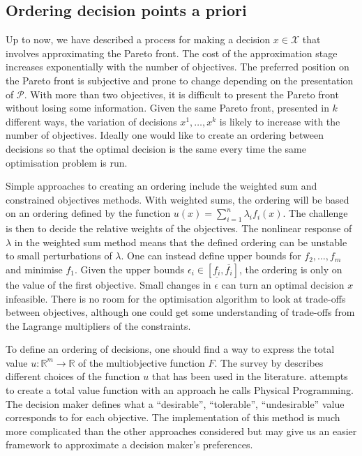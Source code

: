 \documentclass[main.tex]{subfiles}
\begin{document}
\subsection{Ordering decision points a priori}\label{sec:multi_apriori}
Up to now, we have described a process for making a decision
$x\in\mathcal{X}$ that involves approximating the Pareto
front.
The cost of the approximation stage increases exponentially with the
number of objectives. The preferred position on the Pareto front is
subjective and prone to change depending on the presentation of
$\mathcal{P}$. With more than two objectives, it is difficult to
present the Pareto front without losing some information.
Given the same Pareto front, presented in
$k$ different ways, the variation of decisions $x^1,\dots,x^k$ is likely to
increase with the number of objectives.
Ideally one would like to create an ordering between decisions so
that the optimal decision is the same every time the same optimisation
problem is run.

Simple approaches to creating an ordering include the weighted sum
and constrained objectives methods.
With weighted sums, the ordering will be based on
an ordering defined by the function $u(x)=\sum_{i=1}^n\lambda_if_i(x)$.
The challenge is then to decide the relative weights of the objectives. The
nonlinear response of $\lambda$ in the weighted sum method means that
the defined ordering can be unstable to small perturbations of $\lambda$.
One can instead define upper bounds for $f_2,\dots,f_m$ and minimise
$f_1$.
Given the upper bounds
$\epsilon_i\in[\underline{f_i},\overline{f_i}]$,
the ordering is only on the value of the first objective.
Small changes in $\epsilon$ can turn an optimal decision $x$
infeasible. There is no room for the optimisation algorithm to
look at trade-offs between objectives, although one could get some
understanding of trade-offs from the
Lagrange multipliers of the constraints.

To define an ordering of decisions, one should find a way to express
the total value $u:\mathbb{R}^m\to\mathbb{R}$ of the multiobjective
function $F$. The survey by \citet{marler2004survey} describes
different choices of the function $u$ that has been used in the literature.
\citet{messac1996physical} attempts to create a total value function
with an approach he calls Physical Programming. The decision
maker defines what a ``desirable'', ``tolerable'',
``undesirable'' value corresponds to for each objective. The implementation of this method
is much more complicated than the other approaches considered but
may give us an easier framework to approximate a decision maker's preferences.
\end{document}
